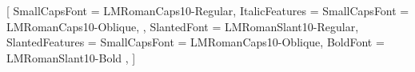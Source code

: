 
%
%


\ifunicodeengine

    \ifluatex
      \setmainfont{Latin Modern Roman}[
        SmallCapsFont = {LMRomanCaps10-Regular},
        ItalicFeatures = {
          SmallCapsFont = {LMRomanCaps10-Oblique},
        },
        SlantedFont = {LMRomanSlant10-Regular},
        SlantedFeatures = {
          SmallCapsFont = {LMRomanCaps10-Oblique},
          BoldFont = {LMRomanSlant10-Bold}
        },
      ]
    \fi

